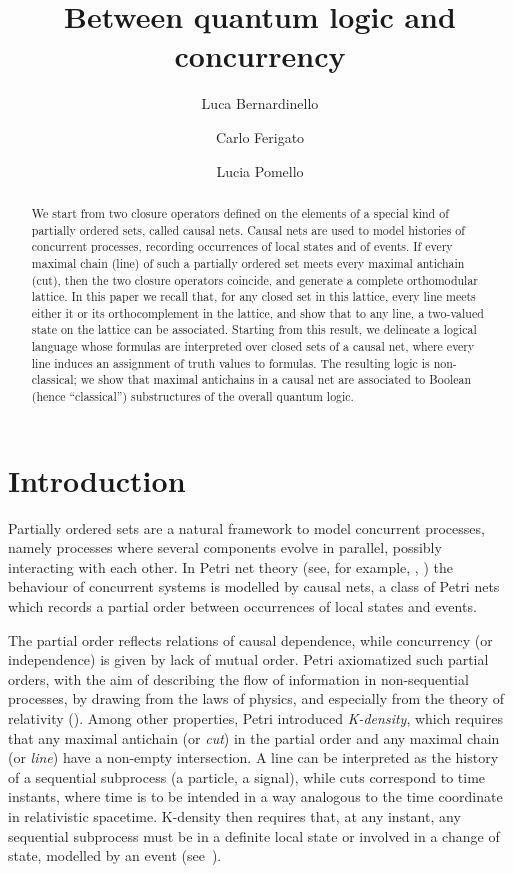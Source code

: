 \documentclass{eptcs}
\title{Between quantum logic and concurrency}
\author{Luca Bernardinello
    \institute{DISCo, Universit\`a degli studi di Milano--Bicocca\\
          viale Sarca 336 U14, Milano, Italia
    }
  \and
          Carlo Ferigato
    \institute{JRC, Joint Research Centre of the European Commission\\
          via E. Fermi, 1 21027 Ispra, Italia
    }
  \and
          Lucia Pomello
    \institute{DISCo, Universit\`a degli studi di Milano--Bicocca\\
          viale Sarca 336 U14, Milano, Italia
    }
  }
\begin{document}
\maketitle
\begin{abstract}
  We start from two closure operators defined on the elements of
  a special kind of partially ordered sets, called causal nets.
  Causal nets are used to model histories of concurrent
  processes, recording occurrences of local states and of events.
  If every maximal chain (line) of such a partially ordered set meets
  every maximal antichain (cut), then the two closure operators coincide,
  and generate a complete orthomodular lattice. In this paper we
  recall that, for any closed set in this lattice, every line meets
  either it or its orthocomplement in the lattice, and show that
  to any line, a two-valued state on the lattice can be associated. 
  Starting from this result, we delineate a logical language whose
  formulas are interpreted over closed sets of a causal net, where
  every line induces an assignment of truth values to formulas.
  The resulting logic is non-classical; we show that maximal
  antichains in a causal net are associated to Boolean (hence
  ``classical'') substructures of the overall quantum logic.
\end{abstract}
\section{Introduction}
Partially ordered sets are a natural framework to model concurrent
processes, namely processes where
several components evolve in parallel, possibly interacting with each other.
In Petri net theory (see, for example, \cite{P77}, \cite{BF88})
the behaviour of concurrent
systems is modelled by causal nets,
a class of Petri nets which records a partial order between
occurrences of local states and events.

The partial order reflects relations of causal dependence, while
concurrency (or independence) is given by lack of
mutual order.
Petri axiomatized such partial orders, with the aim of describing
the flow of information in non-sequential processes, by drawing from
the laws of physics, and especially from the theory of relativity
(\cite{P_ijtp82}).
Among other properties, Petri introduced \emph{K-density}, which
requires that any maximal antichain (or \emph{cut}) in the partial order
and any maximal chain (or \emph{line}) have a non-empty intersection.
A line can be interpreted as the history of a sequential subprocess
(a particle, a signal), while cuts correspond to time instants,
where time is to be intended in a way analogous to the time
coordinate in relativistic spacetime.
K-density then requires that, at any instant, any sequential
subprocess must be in a definite local state or involved in a
change of state, modelled by an event (see~\cite{BF88}).
\end{document}
